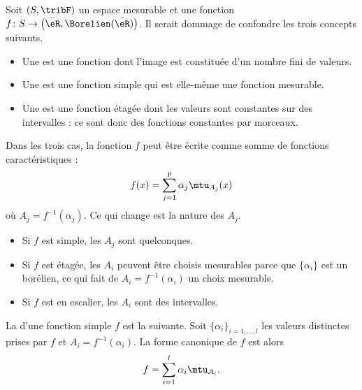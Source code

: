 \begin{definition}\label{DefBPCxdel}
    Soit \( (S,\tribF)\) un espace mesurable et une fonction \( f\colon S\to \big( \bar\eR,\Borelien(\bar\eR) \big)\). Il serait dommage de confondre les trois concepts suivants.
    \begin{itemize}
        \item
            Une  est une fonction dont l'image est constituée d'un nombre fini de valeurs.
        \item
            Une  est une fonction simple qui est elle-même une fonction mesurable.
        \item
            Une  est une fonction étagée dont les valeurs sont constantes sur des intervalles : ce sont donc des fonctions constantes par morceaux.
    \end{itemize}
\end{definition}

Dans les trois cas, la fonction \( f\) peut être écrite comme somme de fonctions caractéristiques :
\begin{equation}
    f(x)=\sum_{j=1}^p\alpha_j\mtu_{A_j}(x)
\end{equation}
où \( A_j=f^{-1}(\alpha_j)\). Ce qui change est la nature des \( A_j\).

\begin{itemize}
    \item Si \( f\) est  simple, les \( A_j\) sont quelconques.
    \item Si \( f\) est étagée, les \( A_i\) peuvent être choisis mesurables parce que \( \{\alpha_i \}\) est un borélien, ce qui fait de \( A_i=f^{-1}(\alpha_i)\) un choix mesurable.
    \item Si \( f\) est en escalier, les \( A_i\) sont des intervalles.
\end{itemize}

\begin{definition}
    La  d'une fonction simple \( f\) est la suivante. Soit \( \{ \alpha_i \}_{i=1,\ldots, l}\) les valeurs distinctes prises par \( f\) et \( A_i=f^{-1}(\alpha_i)\). La forme canonique de \( f\) est alors
    \begin{equation}
        f=\sum_{i=1}^l\alpha_i\mtu_{A_i}.
    \end{equation}
\end{definition}

